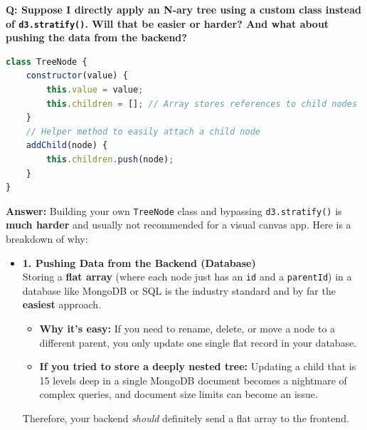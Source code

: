 \documentclass[12pt, a4paper]{article}
\begin{document}
\vspace{1em}
\begin{tcolorbox}[colback=blue!5!white,colframe=blue!75!black,title=Architecture FAQ: Custom Class vs d3.stratify]
\textbf{Q: Suppose I directly apply an N-ary tree using a custom class instead of \texttt{d3.stratify()}. Will that be easier or harder? And what about pushing the data from the backend?}

\begin{lstlisting}[language=javascript, caption={Custom TreeNode Approach}]
class TreeNode {
    constructor(value) {
        this.value = value;
        this.children = []; // Array stores references to child nodes
    }
    // Helper method to easily attach a child node
    addChild(node) {
        this.children.push(node);
    }
}
\end{lstlisting}

\textbf{Answer:}
Building your own \texttt{TreeNode} class and bypassing \texttt{d3.stratify()} is \textbf{much harder} and usually not recommended for a visual canvas app. Here is a breakdown of why:

\begin{itemize}
    \item \textbf{1. Pushing Data from the Backend (Database)} \\
    Storing a \textbf{flat array} (where each node just has an \texttt{id} and a \texttt{parentId}) in a database like MongoDB or SQL is the industry standard and by far the \textbf{easiest} approach.
    \begin{itemize}
        \item \textbf{Why it's easy:} If you need to rename, delete, or move a node to a different parent, you only update one single flat record in your database.
        \item \textbf{If you tried to store a deeply nested tree:} Updating a child that is 15 levels deep in a single MongoDB document becomes a nightmare of complex queries, and document size limits can become an issue.
    \end{itemize}
    Therefore, your backend \emph{should} definitely send a flat array to the frontend.


\end{itemize}
\end{tcolorbox}
\end{document}
